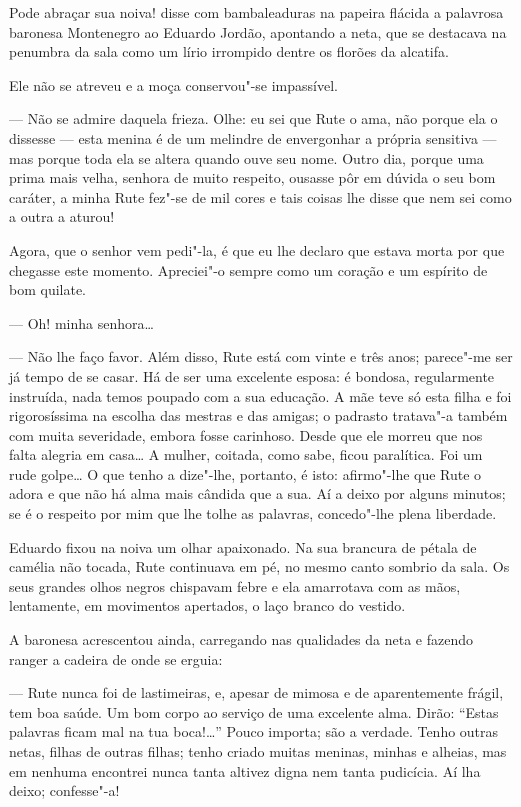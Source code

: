 \bigskip

\noindent{}Pode abraçar sua noiva! disse com bambaleaduras na papeira flácida a
palavrosa baronesa Montenegro ao Eduardo Jordão, apontando a neta, que
se destacava na penumbra da sala como um lírio irrompido dentre os
florões da alcatifa.

Ele não se atreveu e a moça conservou"-se impassível.

--- Não se admire daquela frieza. Olhe: eu sei que Rute o ama, não porque
ela o dissesse --- esta menina é de um melindre de envergonhar a própria
sensitiva --- mas porque toda ela se altera quando ouve seu nome. Outro
dia, porque uma prima mais velha, senhora de muito respeito, ousasse pôr
em dúvida o seu bom caráter, a minha Rute fez"-se de mil cores e tais
coisas lhe disse que nem sei como a outra a aturou!

Agora, que o senhor vem pedi"-la, é que eu lhe declaro que estava morta
por que chegasse este momento. Apreciei"-o sempre como um coração e um
espírito de bom quilate.

--- Oh! minha senhora\ldots{}

--- Não lhe faço favor. Além disso, Rute está com vinte e três anos;
parece"-me ser já tempo de se casar. Há de ser uma excelente esposa: é
bondosa, regularmente instruída, nada temos poupado com a sua educação.
A mãe teve só esta filha e foi rigorosíssima na escolha das mestras e
das amigas; o padrasto tratava"-a também com muita severidade, embora
fosse carinhoso. Desde que ele morreu que nos falta alegria em casa\ldots{} A
mulher, coitada, como sabe, ficou paralítica. Foi um rude golpe\ldots{} O que
tenho a dize"-lhe, portanto, é isto: afirmo"-lhe que Rute o adora e que
não há alma mais cândida que a sua. Aí a deixo por alguns minutos; se é
o respeito por mim que lhe tolhe as palavras, concedo"-lhe plena
liberdade.

Eduardo fixou na noiva um olhar apaixonado. Na sua brancura de pétala de
camélia não tocada, Rute continuava em pé, no mesmo canto sombrio da
sala. Os seus grandes olhos negros chispavam febre e ela amarrotava com
as mãos, lentamente, em movimentos apertados, o laço branco do vestido.

A baronesa acrescentou ainda, carregando nas qualidades da neta e
fazendo ranger a cadeira de onde se erguia:

--- Rute nunca foi de lastimeiras, e, apesar de mimosa e de aparentemente
frágil, tem boa saúde. Um bom corpo ao serviço de uma excelente alma.
Dirão: ``Estas palavras ficam mal na tua boca!\ldots{}'' Pouco importa; são a
verdade. Tenho outras netas, filhas de outras filhas; tenho criado
muitas meninas, minhas e alheias, mas em nenhuma encontrei nunca tanta
altivez digna nem tanta pudicícia. Aí lha deixo; confesse"-a!


